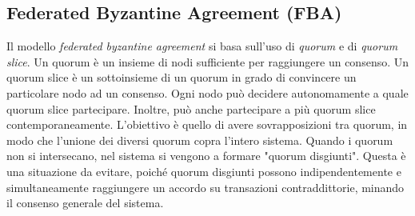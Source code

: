 \subsection{Federated Byzantine Agreement (FBA)}
\label{intro:fba}
Il modello \textit{federated byzantine agreement} si basa sull'uso di \textit{quorum}
e di \textit{quorum slice}.
Un quorum è un insieme di nodi sufficiente per raggiungere un consenso.
Un quorum slice è
un sottoinsieme di un quorum in grado di convincere un particolare nodo ad un consenso.
Ogni nodo può decidere autonomamente a quale quorum slice partecipare. Inoltre, può anche partecipare a
più quorum slice contemporaneamente.
L'obiettivo è quello di avere sovrapposizioni tra quorum, in modo che l'unione dei diversi quorum
copra l'intero sistema. Quando i quorum non si intersecano, nel sistema si vengono a formare
"quorum disgiunti". Questa è una situazione da evitare, poiché quorum disgiunti
possono indipendentemente e simultaneamente raggiungere un accordo su transazioni contraddittorie,
minando il consenso generale del sistema.



